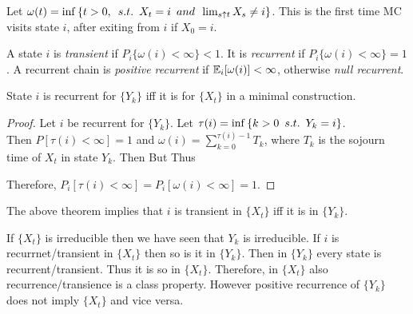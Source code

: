 \documentclass[all-lectures.tex]{subfiles}
\begin{document}
Let $\omega(t) = \inf{\{t >0, \enskip s.t. \enskip  X_t = i \enskip and \enskip \lim_{s \uparrow t}X_s \neq i\}}$.
This is the first time MC visits state $i$, after exiting from $i$ if $X_0 = i$.
\begin{defn}
A state $i$ is \textit{transient} if $P_i\{\omega(i)< \infty\} <1$.
It is \textit{recurrent} if $P_i\{\omega(i)< \infty\} = 1$. A recurrent chain is \textit{positive recurrent} if $\mathbb{E}_i[\omega(i)] < \infty$, otherwise \textit{null recurrent}.
\end{defn}
\begin{thm}
State $i$ is recurrent for $\{Y_k\}$ iff it is for $\{X_t\}$ in a minimal construction.
\end{thm}
\begin{proof}
Let $i$ be recurrent for $\{Y_k\}$. Let $\tau(i) = \inf{\{k>0 \enskip s.t.  \enskip Y_k = i\}}$.\\
Then $P[\tau(i) < \infty] = 1$ and $\omega(i) = \sum_{k=0}^{\tau(i)-1} T_k$, where $T_k$ is the sojourn time of $X_t$ in state $Y_k$. Then
But
Thus

Therefore, $P_i[\tau(i) < \infty] = P_i[\omega(i) < \infty] = 1$.
\end{proof}
The above theorem implies that $i$ is transient in $\{X_t\}$  iff it is in $\{Y_k\}$.

If  $\{X_t\}$ is irreducible then we have seen that $Y_k$ is irreducible.
If $i$ is recurrnet/transient in $\{X_t\}$ then so is it in $\{Y_k\}$. Then in $\{Y_k\}$ every state is recurrent/transient. Thus it is so in $\{X_t\}$. Therefore, in $\{X_t\}$ also recurrence/transience is a class property. However positive recurrence of $\{Y_k\}$ does not imply $\{X_t\}$ and vice versa.
\end{document}
